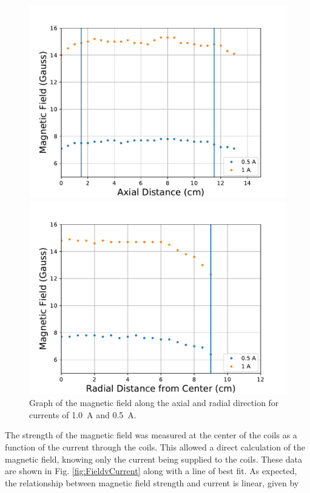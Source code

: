 \begin{figure}[h]
		\centering
		\begin{minipage}{.49\textwidth}
			\includegraphics[width = .9\textwidth]{Images/FieldAxial.pdf}
		\end{minipage}
		\begin{minipage}{.49\textwidth}
			\includegraphics[width = .9\textwidth]{Images/FieldRadial.pdf}
		\end{minipage}
		\caption{Graph of the magnetic field along the axial and radial direction for currents of \SI{1.0}{A} and \SI{0.5}{A}.}
		\label{fig:FieldAxial}
\end{figure}


The strength of the magnetic field was measured at the center of the coils as a function of the current through the coils. This allowed a direct calculation of the magnetic field, knowing only the current being supplied to the coils. These data are shown in Fig. \ref{fig:FieldvCurrent} along with a line of best fit. As expected, the relationship between magnetic field strength and current is linear, given by

